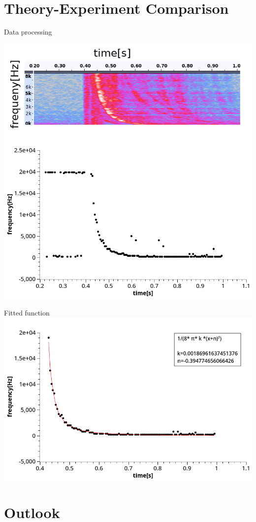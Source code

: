 \documentclass{beamer}
\begin{document}
\section {Theory-Experiment Comparison}
	\begin{frame}{Data processing}
	\begin{center}
	
		\includegraphics [scale=0.45]{images/axies.png}
		\includegraphics [scale=0.26]{images/converted_csv.png}
	\end{center}

	\end{frame}

	\begin{frame}{Fitted function}
		\includegraphics [scale=0.4]{images/fitted_function.png}
		
	\end{frame}


\section {Outlook}
\end{document}
